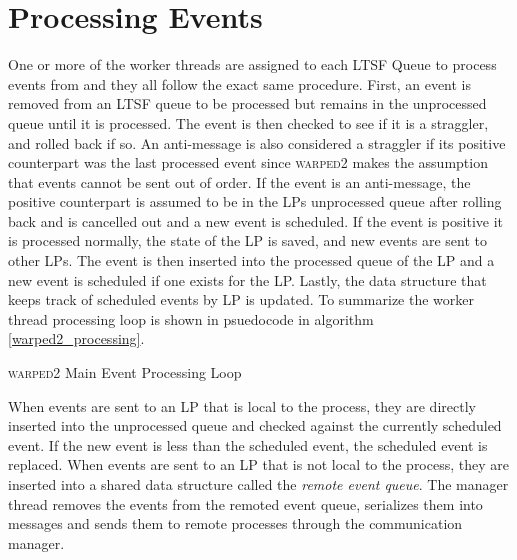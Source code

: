 \documentclass[11pt]{book}
\begin{document}
\section{Processing Events}

One or more of the worker threads are assigned to each LTSF Queue to process events from
and they all follow the exact same procedure. First, an event is removed from an LTSF
queue to be processed but remains in the unprocessed queue until it is processed. The
event is then checked to see if it is a straggler, and rolled back if so. An anti-message
is also considered a straggler if its positive counterpart was the last processed event
since \textsc{warped2} makes the assumption that events cannot be sent out of order.
If the event is an anti-message, the positive counterpart is assumed to be in the LPs
unprocessed queue after rolling back and is cancelled out and a new event is scheduled.
If the event is positive it is processed normally, the state of the LP is saved, and
new events are sent to other LPs. The event is then inserted into the processed queue
of the LP and a new event is scheduled if one exists for the LP. Lastly, the data structure
that keeps track of scheduled events by LP is updated. To summarize the worker thread
processing loop is shown in psuedocode in algorithm \ref{warped2_processing}.

\begin{algorithm}
\DontPrintSemicolon
{}
\SetAlgoVlined


\caption{\textsc{warped2} Main Event Processing Loop}\label{warped2_processing}
\end{algorithm}

When events are sent to an LP that is local to the process, they are directly inserted
into the unprocessed queue and checked against the currently scheduled event. If the
new event is less than the scheduled event, the scheduled event is replaced. When events
are sent to an LP that is not local to the process, they are inserted into a shared data
structure called the \emph{remote event queue}. The manager thread removes the events from
the remoted event queue, serializes them into messages and sends them to remote processes
through the communication manager.
\end{document}
